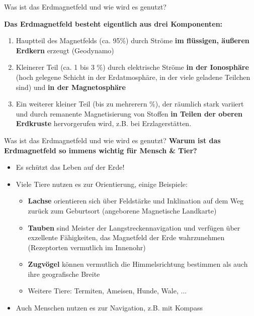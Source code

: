 \documentclass[10pt]{beamer}
\begin{document}
\begin{frame}{Was ist das Erdmagnetfeld und wie wird es genutzt?}

\textbf{Das Erdmagnetfeld besteht eigentlich aus drei Komponenten:}\pause
\begin{enumerate}
   \item Hauptteil des Magnetfelds (ca. 95\%) durch Ströme \textbf{im flüssigen, äußeren Erdkern} erzeugt (Geodynamo)\pause
    \item  Kleinerer Teil (ca. 1 bis 3 \%) durch elektrische Ströme \textbf{in der Ionosphäre} (hoch gelegene Schicht in der Erdatmosphäre, in der viele geladene Teilchen sind) und \textbf{in der Magnetosphäre} \pause
    \item Ein weiterer kleiner Teil (bis zu mehrerern \%), der räumlich stark variiert und durch remanente Magnetisierung von Stoffen \textbf{in Teilen der oberen Erdkruste} hervorgerufen wird, z.B. bei Erzlagerstätten.\pause
\end{enumerate}
\end{frame}

\begin{frame}{Was ist das Erdmagnetfeld und wie wird es genutzt?}
\textbf{Warum ist das Erdmagnetfeld so immens wichtig für Mensch \& Tier?}\pause
\begin{itemize}
    \item Es schützt das Leben auf der Erde! \pause
    \item Viele Tiere nutzen es zur Orientierung, einige Beispiele:\pause
    \begin{itemize}
        \item \textbf{Lachse} orientieren sich über Feldstärke und Inklination auf dem Weg zurück zum Geburtsort (angeborene Magnetische Landkarte)\pause
        \item \textbf{Tauben} sind Meister der Langstreckennavigation und verfügen über exzellente Fähigkeiten, das Magnetfeld der Erde wahrzunehmen (Rezeptorten vermutlich im Innenohr) \pause
        \item \textbf{Zugvögel} können vermutlich die Himmelsrichtung bestimmen als auch ihre geografische Breite\pause
        \item Weitere Tiere: Termiten, Ameisen, Hunde, Wale, ...\pause
    \end{itemize}
    \item Auch Menschen nutzen es zur Navigation, z.B. mit Kompass
\end{itemize}
    
\end{frame}
\end{document}
